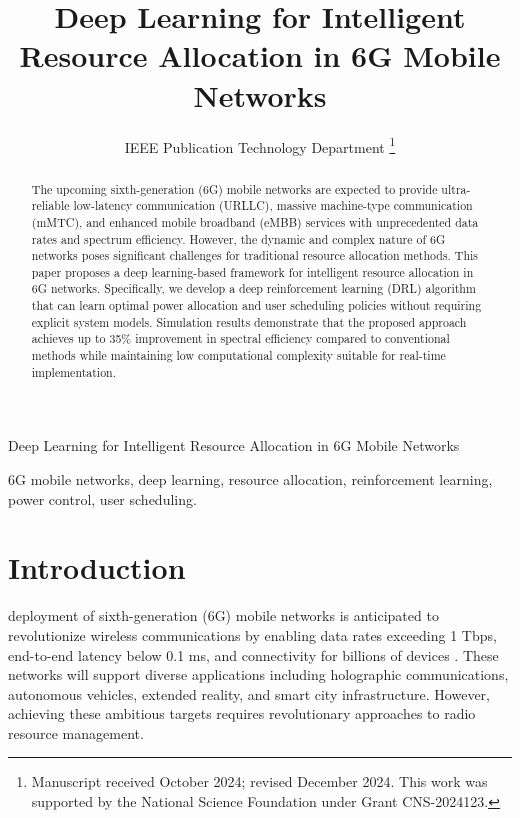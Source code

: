 \documentclass[journal]{IEEEtran}
\begin{document}
\title{Deep Learning for Intelligent Resource Allocation in 6G Mobile Networks}

\author{IEEE Publication Technology Department
\thanks{Manuscript received October 2024; revised December 2024. This work was supported by the National Science Foundation under Grant CNS-2024123.}}
%
{Deep Learning for Intelligent Resource Allocation in 6G Mobile Networks}

\maketitle

\begin{abstract}
The upcoming sixth-generation (6G) mobile networks are expected to provide ultra-reliable low-latency communication (URLLC), massive machine-type communication (mMTC), and enhanced mobile broadband (eMBB) services with unprecedented data rates and spectrum efficiency. However, the dynamic and complex nature of 6G networks poses significant challenges for traditional resource allocation methods. This paper proposes a deep learning-based framework for intelligent resource allocation in 6G networks. Specifically, we develop a deep reinforcement learning (DRL) algorithm that can learn optimal power allocation and user scheduling policies without requiring explicit system models. Simulation results demonstrate that the proposed approach achieves up to 35\% improvement in spectral efficiency compared to conventional methods while maintaining low computational complexity suitable for real-time implementation.
\end{abstract}

\begin{IEEEkeywords}
6G mobile networks, deep learning, resource allocation, reinforcement learning, power control, user scheduling.
\end{IEEEkeywords}

\section{Introduction}
 deployment of sixth-generation (6G) mobile networks is anticipated to revolutionize wireless communications by enabling data rates exceeding 1 Tbps, end-to-end latency below 0.1 ms, and connectivity for billions of devices \cite{You2021}. These networks will support diverse applications including holographic communications, autonomous vehicles, extended reality, and smart city infrastructure. However, achieving these ambitious targets requires revolutionary approaches to radio resource management.
\end{document}

